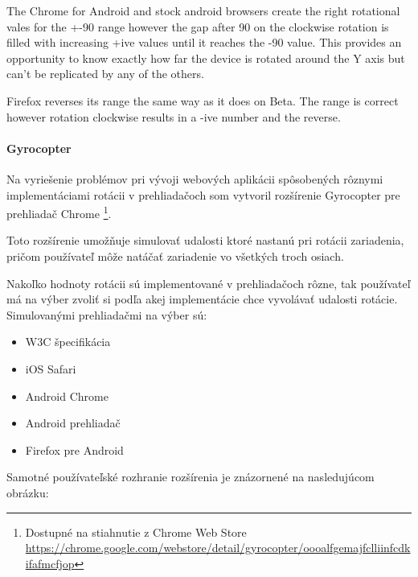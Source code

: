The Chrome for Android and stock android browsers create the right rotational vales for the +-90 range however the gap after 90 on the clockwise rotation is filled with increasing +ive values until it reaches the -90 value. This provides an opportunity to know exactly how far the device is rotated around the Y axis but can't be replicated by any of the others.

Firefox reverses its range the same way as it does on Beta. The range is correct however rotation clockwise results in a -ive number and the reverse.



\paragraph{Gyrocopter} %
\label{par:gyrocopter}

Na vyriešenie problémov pri vývoji webových aplikácii spôsobených rôznymi implementáciami rotácii v prehliadačoch som vytvoril rozšírenie Gyrocopter pre prehliadač Chrome \footnote{Dostupné na stiahnutie z Chrome Web Store \url{https://chrome.google.com/webstore/detail/gyrocopter/oooalfgemajfclliinfcdkifafmcfjop}}.

Toto rozšírenie umožňuje simulovať udalosti ktoré nastanú pri rotácii zariadenia, pričom používateľ môže natáčať zariadenie vo všetkých troch osiach.

Nakoľko hodnoty rotácii sú implementované v prehliadačoch rôzne, tak používateľ má na výber zvoliť si podľa akej implementácie chce vyvolávať udalosti rotácie. Simulovanými prehliadačmi na výber sú:

\begin{itemize}
  \item W3C špecifikácia
  \item iOS Safari
  \item Android Chrome
  \item Android prehliadač
  \item Firefox pre Android
\end{itemize}

Samotné používateľské rozhranie rozšírenia je znázornené na nasledujúcom obrázku:

